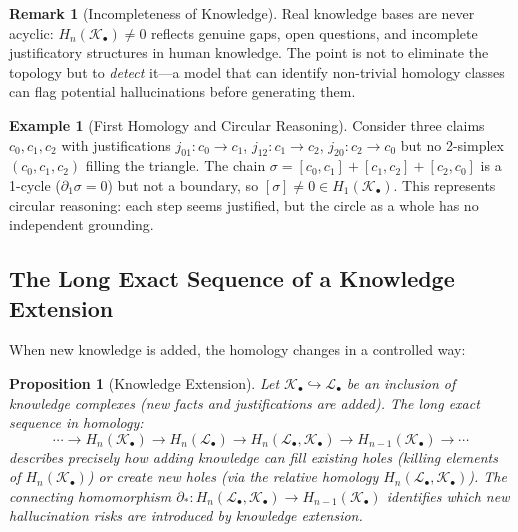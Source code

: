 \documentclass[11pt,a4paper]{article}
\theoremstyle{plain}
\newtheorem{proposition}[theorem]{Proposition}
\theoremstyle{definition}
\newtheorem{example}[theorem]{Example}
\newtheorem{remark}[theorem]{Remark}
\begin{document}
\begin{remark}[Incompleteness of Knowledge]
Real knowledge bases are never acyclic: $H_n(\mathcal{K}_\bullet) \neq 0$ reflects genuine gaps, open questions, and incomplete justificatory structures in human knowledge. The point is not to eliminate the topology but to \emph{detect} it---a model that can identify non-trivial homology classes can flag potential hallucinations before generating them.
\end{remark}

\begin{example}[First Homology and Circular Reasoning]\label{ex:circular}
Consider three claims $c_0, c_1, c_2$ with justifications $j_{01}\colon c_0 \to c_1$, $j_{12}\colon c_1 \to c_2$, $j_{20}\colon c_2 \to c_0$ but no 2-simplex $(c_0, c_1, c_2)$ filling the triangle. The chain $\sigma = [c_0, c_1] + [c_1, c_2] + [c_2, c_0]$ is a 1-cycle ($\partial_1 \sigma = 0$) but not a boundary, so $[\sigma] \neq 0 \in H_1(\mathcal{K}_\bullet)$. This represents circular reasoning: each step seems justified, but the circle as a whole has no independent grounding.
\end{example}

\subsection{The Long Exact Sequence of a Knowledge Extension}

When new knowledge is added, the homology changes in a controlled way:

\begin{proposition}[Knowledge Extension]\label{prop:extension}
Let $\mathcal{K}_\bullet \hookrightarrow \mathcal{L}_\bullet$ be an inclusion of knowledge complexes (new facts and justifications are added). The long exact sequence in homology:
\[
  \cdots \to H_n(\mathcal{K}_\bullet) \to H_n(\mathcal{L}_\bullet) \to H_n(\mathcal{L}_\bullet, \mathcal{K}_\bullet) \to H_{n-1}(\mathcal{K}_\bullet) \to \cdots
\]
describes precisely how adding knowledge can \emph{fill} existing holes (killing elements of $H_n(\mathcal{K}_\bullet)$) or \emph{create new} holes (via the relative homology $H_n(\mathcal{L}_\bullet, \mathcal{K}_\bullet)$). The connecting homomorphism $\partial_*\colon H_n(\mathcal{L}_\bullet, \mathcal{K}_\bullet) \to H_{n-1}(\mathcal{K}_\bullet)$ identifies which new hallucination risks are introduced by knowledge extension.
\end{proposition}

\end{document}
